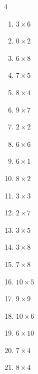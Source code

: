 \begin{multicols}{4}
\begin{enumerate}
  \item $3\times 6$
        \phantom{$=18$}

  \item $0\times 2$
        \phantom{$=0$}

  \item $6\times 8$
        \phantom{$=48$}

  \item $7\times 5$
        \phantom{$=35$}

  \item $8\times 4$
        \phantom{$=32$}

  \item $9\times 7$
        \phantom{$=63$}

  \item $2\times 2$
        \phantom{$=4$}

  \item $6\times 6$
        \phantom{$=36$}

  \item $6\times 1$
        \phantom{$=6$}

  \item $8\times 2$
        \phantom{$=16$}

  \item $3\times 3$
        \phantom{$=9$}

  \item $2\times 7$
        \phantom{$=14$}

  \item $3\times 5$
        \phantom{$=15$}

  \item $3\times 8$
        \phantom{$=24$}

  \item $7\times 8$
        \phantom{$=56$}

  \item $10\times 5$
        \phantom{$=50$}

  \item $9\times 9$
        \phantom{$=81$}

  \item $10\times 6$
        \phantom{$=60$}

  \item $6\times 10$
        \phantom{$=60$}

  \item $7\times 4$
        \phantom{$=28$}

  \item $8\times 4$
        \phantom{$=32$}


\end{enumerate}
\end{multicols}
